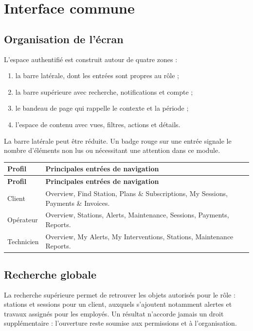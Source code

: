 \chapter{Interface commune}

\section{Organisation de l'écran}

L'espace authentifié est construit autour de quatre zones :

\begin{enumerate}[leftmargin=1.6em]
  \item la barre latérale, dont les entrées sont propres au rôle ;
  \item la barre supérieure avec recherche, notifications et compte ;
  \item le bandeau de page qui rappelle le contexte et la période ;
  \item l'espace de contenu avec vues, filtres, actions et détails.
\end{enumerate}

La barre latérale peut être réduite. Un badge rouge sur une entrée signale le
nombre d'éléments non lus ou nécessitant une attention dans ce module.

\begin{longtable}{|L{2.8cm}|L{12.7cm}|}
  \hline
  \textbf{Profil} & \textbf{Principales entrées de navigation} \\ \hline
  \endfirsthead
  \hline
  \textbf{Profil} & \textbf{Principales entrées de navigation} \\ \hline
  \endhead
  Client & Overview, Find Station, Plans \& Subscriptions, My Sessions,
  Payments \& Invoices. \\ \hline
  Opérateur & Overview, Stations, Alerts, Maintenance, Sessions, Payments,
  Reports. \\ \hline
  Technicien & Overview, My Alerts, My Interventions, Stations, Maintenance
  Reports. \\ \hline
\end{longtable}

\section{Recherche globale}

La recherche supérieure permet de retrouver les objets autorisés pour le rôle :
stations et sessions pour un client, auxquels s'ajoutent notamment alertes et
travaux assignés pour les employés. Un résultat n'accorde jamais un droit
supplémentaire : l'ouverture reste soumise aux permissions et à l'organisation.

